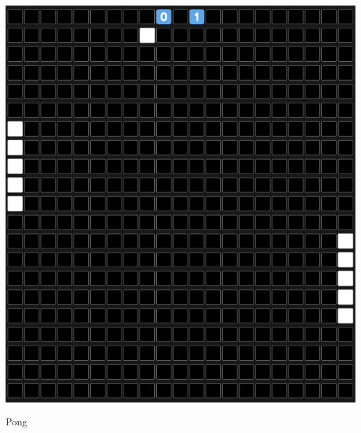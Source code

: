 \documentclass{article}
\begin{document}
\begin{multicols}{2}
\begin{minipage}{\linewidth}
    \centering
    \includegraphics[width=0.8\linewidth]{pong.png}
    \captionsetup{type=figure}
    \caption{Pong}
    \label{fig:enter-label}
\end{minipage}

\end{multicols}

\pagebreak
\end{document}
